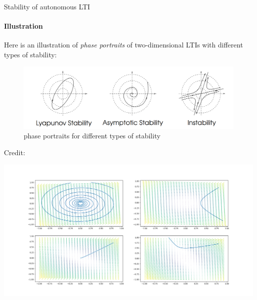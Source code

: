\documentclass{beamer}
\begin{document}
\begin{frame}{Stability of autonomous LTI}
\framesubtitle{Illustration}
\begin{flushleft}

Here is an illustration of \emph{phase portraits} of two-dimensional LTIs with different types of stability:

\begin{figure}
    \centering
    \includegraphics[width=1.0\linewidth]{Stability.PNG}
    \caption{phase portraits for different types of stability}
    \label{fig:Stability}
\end{figure}

\bigskip

\scriptsize{Credit: }

\end{flushleft}
\end{frame}


\begin{frame}
\hspace*{-2.5cm}
\includegraphics[height=\textheight,width=1.4\textwidth,keepaspectratio]{Figure_2.png}
\end{frame}
\end{document}
